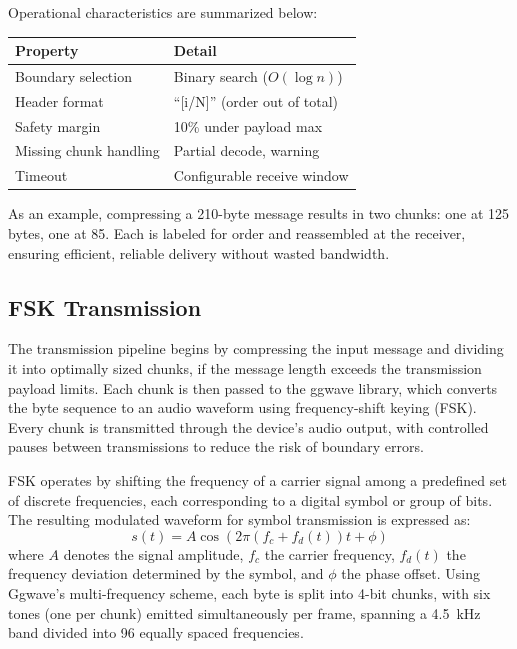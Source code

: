 \documentclass[12pt,openany]{article}
\theoremstyle{definition}
\theoremstyle{definition}
\theoremstyle{definition}
\begin{document}
Operational characteristics are summarized below:

\begin{table}[h]
\centering
\begin{tabular}{|l|l|}
\hline
\textbf{Property} & \textbf{Detail} \\
\hline
Boundary selection & Binary search ($O(\log n)$) \\
Header format & “[i/N]” (order out of total) \\
Safety margin & 10\% under payload max \\
Missing chunk handling & Partial decode, warning \\
Timeout & Configurable receive window \\
\hline
\end{tabular}
\end{table}

As an example, compressing a 210-byte message results in two chunks: one at 125 bytes, one at 85. Each is labeled for order and reassembled at the receiver, ensuring efficient, reliable delivery without wasted bandwidth.

\subsection*{FSK Transmission}
The transmission pipeline begins by compressing the input message and dividing it into optimally sized chunks, if the message length exceeds the transmission payload limits. Each chunk is then passed to the ggwave library, which converts the byte sequence to an audio waveform using frequency-shift keying (FSK). Every chunk is transmitted through the device’s audio output, with controlled pauses between transmissions to reduce the risk of boundary errors.

FSK operates by shifting the frequency of a carrier signal among a predefined set of discrete frequencies, each corresponding to a digital symbol or group of bits. The resulting modulated waveform for symbol transmission is expressed as:
\[
s(t) = A \cos(2\pi(f_c + f_d(t))t + \phi)
\]
where $A$ denotes the signal amplitude, $f_c$ the carrier frequency, $f_d(t)$ the frequency deviation determined by the symbol, and $\phi$ the phase offset. Using Ggwave's multi-frequency scheme, each byte is split into 4-bit chunks, with six tones (one per chunk) emitted simultaneously per frame, spanning a 4.5~kHz band divided into 96 equally spaced frequencies.
\end{document}
